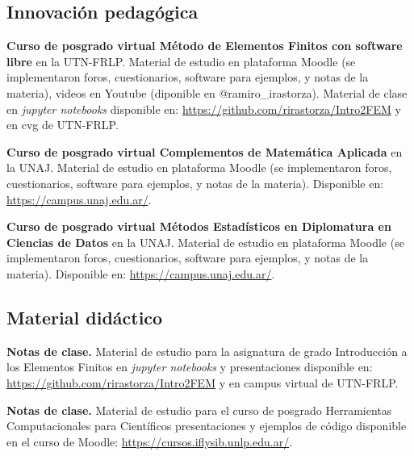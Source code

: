 \documentclass[margin,line]{res}
\begin{document}
\begin{resume}
\subsection{ Innovación pedagógica}

\textbf{Curso de posgrado virtual Método de Elementos Finitos con software libre} en la UTN-FRLP. Material de estudio en plataforma Moodle (se implementaron foros, cuestionarios, software para ejemplos, y notas de la materia), videos en Youtube (diponible en @ramiro\_irastorza). Material de clase en {\it jupyter notebooks} disponible en: \url{https://github.com/rirastorza/Intro2FEM} y en cvg de UTN-FRLP.

\textbf{Curso de posgrado virtual Complementos de Matemática Aplicada} en la UNAJ. Material de estudio en plataforma Moodle (se implementaron foros, cuestionarios, software para ejemplos, y notas de la materia). Disponible en: \url{https://campus.unaj.edu.ar/}.

\textbf{Curso de posgrado virtual Métodos Estadísticos en Diplomatura en Ciencias de Datos} en la UNAJ. Material de estudio en plataforma Moodle (se implementaron foros, cuestionarios, software para ejemplos, y notas de la materia). Disponible en: \url{https://campus.unaj.edu.ar/}.



\subsection{ Material didáctico}

\textbf{Notas de clase.} Material de estudio para la asignatura de grado Introducción a los Elementos Finitos en {\it jupyter notebooks} y presentaciones disponible en: \url{https://github.com/rirastorza/Intro2FEM} y en campus virtual de UTN-FRLP.

\textbf{Notas de clase.} Material de estudio para el curso de posgrado Herramientas Computacionales para Científicos presentaciones y ejemplos de código disponible en el curso de Moodle: \url{https://cursos.iflysib.unlp.edu.ar/}.
%


\end{resume}
\end{document}
